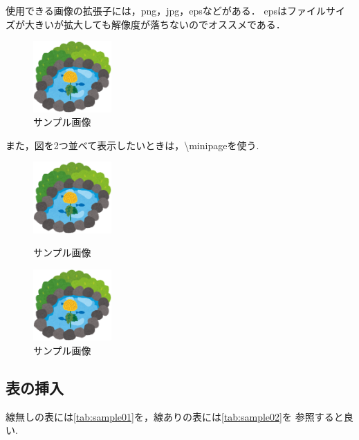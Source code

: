 \documentclass[a4j, twocolumn]{jsarticle}
\begin{document}
使用できる画像の拡張子には，png，jpg，epsなどがある．
epsはファイルサイズが大きいが拡大しても解像度が落ちないのでオススメである．

\begin{figure}[h]
	\begin{center}
		\includegraphics[width=30mm]{img/kikpond.eps}
	 \end{center}
	\caption{サンプル画像}
	\label{fig:sample}
\end{figure}

また，図を2つ並べて表示したいときは，\textbackslash minipageを使う.

\begin{figure}[htbp]
  \begin{minipage}[b]{0.45\linewidth}
    \centering
    \includegraphics[keepaspectratio, width=30mm]{img/kikpond.eps}
    \caption{サンプル画像}
  \end{minipage}
  \begin{minipage}[b]{0.45\linewidth}
    \centering
    \includegraphics[keepaspectratio, width=30mm]{img/kikpond.eps}
    \caption{サンプル画像}
  \end{minipage}
\end{figure}



\subsection{表の挿入}
線無しの表には\ref{tab:sample01}を，線ありの表には\ref{tab:sample02}を
参照すると良い.
\end{document}
